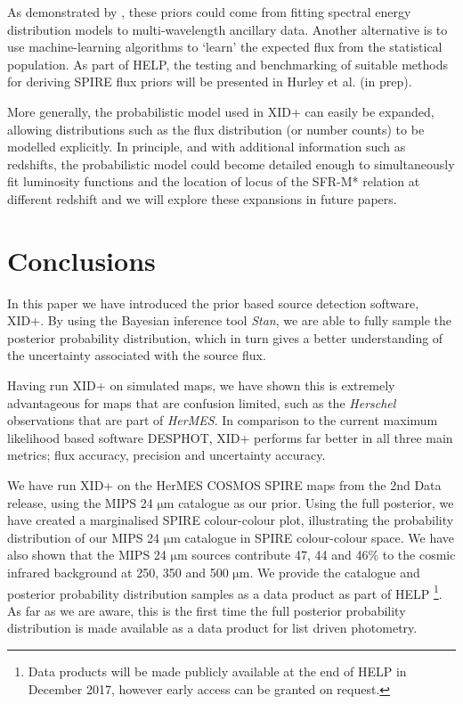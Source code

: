 \documentclass[useAMS,usenatbib]{mnras}
\begin{document}
As demonstrated by \cite{Safarzadeh:2015}, these priors could come from fitting spectral energy distribution models to multi-wavelength ancillary data. Another alternative is to use machine-learning algorithms to `learn' the expected flux from the statistical population. As part of HELP, the testing and benchmarking of suitable methods for deriving SPIRE flux priors will be presented in Hurley et al. (in prep). 

More generally, the probabilistic model used in \textsc{XID+} can easily be expanded, allowing distributions such as the flux distribution (or number counts) to be modelled explicitly. In principle, and with additional information such as redshifts, the probabilistic model could become detailed enough to simultaneously fit luminosity functions and the location of locus of the SFR-M* relation at different redshift and we will explore these expansions in future papers.

\section{Conclusions}\label{sec:conc}
In this paper we have introduced the prior based source detection software, \textsc{XID+}. By using the Bayesian inference tool \emph{Stan}, we are able to fully sample the posterior probability distribution, which in turn gives a better understanding of the uncertainty associated with the source flux. 

Having run \textsc{XID+} on simulated maps, we have shown this is extremely advantageous for maps that are confusion limited, such as the \emph{Herschel} observations that are part of \emph{HerMES}. In comparison to the current maximum likelihood based software \textsc{DESPHOT}, XID+ performs far better in all three main metrics; flux accuracy, precision and uncertainty accuracy.

We have run \textsc{XID+} on the HerMES COSMOS SPIRE maps from the 2nd Data release, using the MIPS 24 $\mathrm{\mu m}$ catalogue \citep{LeFLoch:2009} as our prior. Using the full posterior, we have created a marginalised SPIRE colour-colour plot, illustrating the probability distribution of our MIPS 24 $\mathrm{\mu m}$ catalogue in SPIRE colour-colour space. We have also shown that the MIPS 24 $\mathrm{\mu m}$ sources contribute 47, 44 and 46\%  to the cosmic infrared background at 250, 350 and 500 $\mathrm{\mu m}$. We provide the catalogue and posterior probability distribution samples as a data product as part of HELP \footnote{Data products will be made publicly available at the end of HELP in December 2017, however early access can be granted on request.}. As far as we are aware, this is the first time the full posterior probability distribution is made available as a data product for list driven photometry.
 
\end{document}

